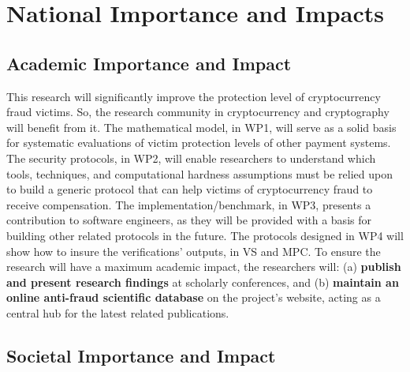  

\section{National Importance and Impacts}

\subsection{Academic Importance and Impact}

This research will significantly improve the protection level of cryptocurrency fraud victims. So, the research community in cryptocurrency and cryptography will benefit from it. 
%
The mathematical model, in WP1, will serve as a solid basis for systematic evaluations of victim protection levels of other payment systems. The security protocols, in WP2, will enable researchers to understand which tools, techniques, and computational hardness assumptions must be relied upon to build a generic protocol that can help victims of cryptocurrency fraud to receive compensation. The implementation/benchmark, in WP3, presents a contribution to software engineers, as they will be provided with a basis for building other related protocols in the future. The protocols designed in WP4 will show how to insure the verifications' outputs, in VS and MPC. To ensure the research will have a maximum academic impact, the researchers will: (a) \textbf{publish and present research findings} at scholarly conferences, and (b) \textbf{maintain an online anti-fraud scientific database} on the project's website, acting as a central hub for the latest related publications.%


\subsection{Societal Importance and Impact}


